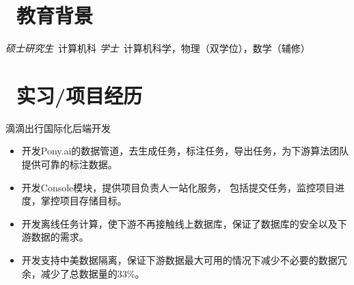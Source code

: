\documentclass{resume}
\begin{document}


 
\section{\faGraduationCap\  教育背景}
\textit{硕士研究生}\ 计算机科
\textit{学士}\ 计算机科学，物理（双学位），数学（辅修）

\section{\faUsers\ 实习/项目经历}
\role{软件开发工程师}{工作经历}
滴滴出行国际化后端开发
\begin{itemize}
  Build Task Generation data-pipeline for Pony.ai labeling platform to process raw data to support labeling team
• Build Exporter data-pipeline to export labeled data to support perception team
• Build Console service to manage user, project, request and task data.
• Develope Console service API to manage data access for other parties for data security
• Reduce resources space by 45%
• Reduce upload time by 20%
  \item 开发Pony.ai的数据管道，去生成任务，标注任务，导出任务，为下游算法团队提供可靠的标注数据。
  \item 开发Console模块，提供项目负责人一站化服务， 包括提交任务，监控项目进度，掌控项目存储目标。
  \item 开发离线任务计算，使下游不再接触线上数据库，保证了数据库的安全以及下游数据的需求。
  \item 开发支持中美数据隔离，保证下游数据最大可用的情况下减少不必要的数据冗余，减少了总数据量的33\%。
\end{itemize}
\end{document}
